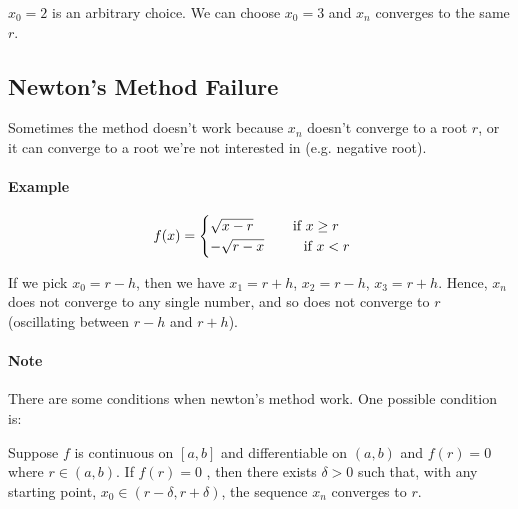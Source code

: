 \documentclass[12pt]{article}
\newcommand\tab[1][1cm]{\hspace*{#1}}
\begin{document}
\noindent
$x_0 = 2$ is an arbitrary choice. We can choose $x_0 =3$ and $x_n$ converges to the same $r$.

\subsection{Newton's Method Failure}
Sometimes the method doesn't work because $x_n$ doesn't converge to a root $r$, or it can converge to a root
we're not interested in (e.g. negative root).
\paragraph{Example}

\begin{align*} 
    f(x) = 
    \begin{cases}
        \sqrt{x - r} \textrm{\tab if } x \geq r \\
        - \sqrt{r - x} \textrm{\tab if } x < r
    \end{cases} 
\end{align*}

If we pick $x_0 = r - h$, then we have $x_1 = r + h$, $x_2 = r - h$, $x_3 = r + h$. Hence, 
$x_n$ does not converge to any single number, and so does not converge to $r$ (oscillating between $r - h$ and $r + h$).


\paragraph{Note} There are some conditions when newton's method work. One possible condition
is: 

Suppose $f$ is continuous on $[a, b]$ and differentiable on $(a, b)$ and $f(r) = 0$ where $r \in (a, b)$.
If $f(r) = 0$ , then there exists $\delta >0$ such that, with any starting point, $x_0 \in (r - \delta, r + \delta)$, 
the sequence $x_n$ converges to $r$.
\end{document}
